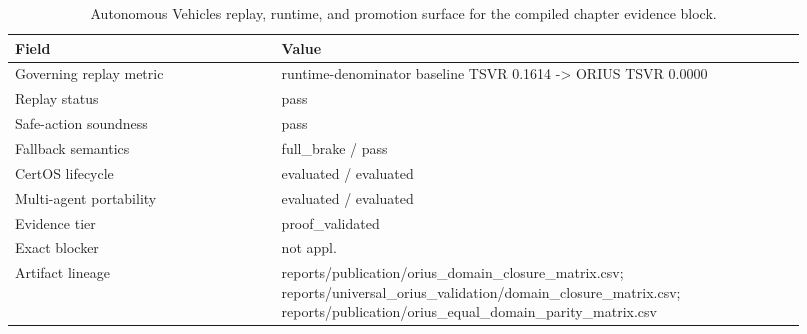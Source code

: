 \begin{table}[htbp]
\centering
\small
\caption{Autonomous Vehicles replay, runtime, and promotion surface for the compiled chapter evidence block.}
\label{tab:av-replay-surface}
\begin{tabular}{p{0.31\linewidth}p{0.61\linewidth}}
\toprule
\textbf{Field} & \textbf{Value}\\
\midrule
Governing replay metric & runtime-denominator baseline TSVR 0.1614 -> ORIUS TSVR 0.0000\\
Replay status & pass\\
Safe-action soundness & pass\\
Fallback semantics & full\_brake / pass\\
CertOS lifecycle & evaluated / evaluated\\
Multi-agent portability & evaluated / evaluated\\
Evidence tier & proof\_validated\\
Exact blocker & not appl.\\
Artifact lineage & reports/publication/orius\_domain\_closure\_matrix.csv; reports/universal\_orius\_validation/domain\_closure\_matrix.csv; reports/publication/orius\_equal\_domain\_parity\_matrix.csv\\
\bottomrule
\end{tabular}
\end{table}
